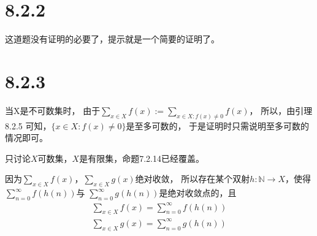 \documentclass{article}
\begin{document}
\section*{8.2.2}

这道题没有证明的必要了，提示就是一个简要的证明了。

\section*{8.2.3}

\begin{zremark}
  当X是不可数集时，
  由于$\sum \limits_{x \in X}f(x) := \sum \limits_{x \in X: f(x)\not = 0}f(x)$，
  所以，由引理8.2.5 可知，$\{x \in X: f(x)\not = 0\}$是至多可数的，
  于是证明时只需说明至多可数的情况即可。

  只讨论$X$可数集，$X$是有限集，命题7.2.14已经覆盖。
\end{zremark}

因为$\sum \limits_{x \in X} f(x)$，$\sum \limits_{x \in X} g(x)$绝对收敛，
所以存在某个双射$h: \mathbb{N} \rightarrow X$，使得
$\sum \limits_{n=0}^\infty f(h(n))$与
$\sum \limits_{n=0}^\infty g(h(n))$是绝对收敛点的，且
\begin{align*}
  \sum \limits_{x \in X} f(x) = \sum \limits_{n=0}^\infty f(h(n)) \\
  \sum \limits_{x \in X} g(x) = \sum \limits_{n=0}^\infty g(h(n))
\end{align*}
\end{document}
